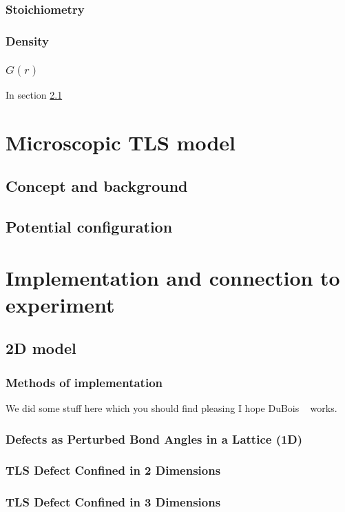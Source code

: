     \subsection{Stoichiometry}
    \subsection{Density}
    \subsection{$G(r)$}
    In section \cref{sec:2d}
    \chapter{Microscopic TLS model}
    \section{Concept and background}
    \section{Potential configuration}
    \chapter{Implementation and connection to experiment}\label{ch:impliementation}
    \section{2D model}\label{sec:2d}
    \subsection{Methods of implementation}
    We did some stuff here which you should find pleasing I hope DuBois \etal~\cite{DuBois2013} works.
    \subsection{Defects as Perturbed Bond Angles in a Lattice (1D)}
    \subsection{TLS Defect Confined in 2 Dimensions}
    \subsection{TLS Defect Confined in 3 Dimensions}

